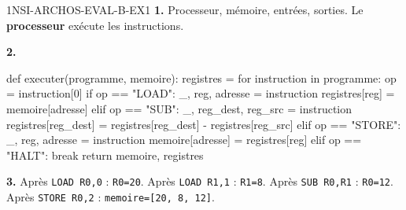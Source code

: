 \begin{corrige}{1NSI-ARCHOS-EVAL-B-EX1}
\textbf{1.} Processeur, mémoire, entrées, sorties. Le \textbf{processeur} exécute les
instructions.

\textbf{2.}
\begin{python}
def executer(programme, memoire):
    registres = {}
    for instruction in programme:
        op = instruction[0]
        if op == "LOAD":
            _, reg, adresse = instruction
            registres[reg] = memoire[adresse]
        elif op == "SUB":
            _, reg_dest, reg_src = instruction
            registres[reg_dest] = registres[reg_dest] - registres[reg_src]
        elif op == "STORE":
            _, reg, adresse = instruction
            memoire[adresse] = registres[reg]
        elif op == "HALT":
            break
    return memoire, registres
\end{python}

\textbf{3.} Après \lstinline{LOAD R0,0} : \lstinline{R0=20}. Après \lstinline{LOAD R1,1} :
\lstinline{R1=8}. Après \lstinline{SUB R0,R1} : \lstinline{R0=12}. Après
\lstinline{STORE R0,2} : \lstinline{memoire=[20, 8, 12]}.
\end{corrige}

